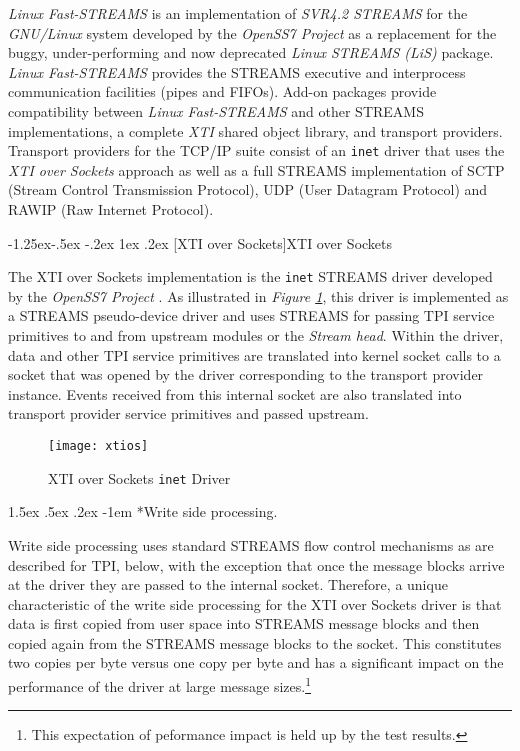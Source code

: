 \documentclass[letterpaper,final,notitlepage,twocolumn,10pt,twoside]{article}
\makeatletter
\renewcommand\subsubsection{\@startsection{subsubsection}{3}{\z@}%
                                     {-1.25ex\@plus -.5ex \@minus -.2ex}%
                                     {1ex \@plus .2ex}%
                                     {\normalfont\normalsize\bfseries}}
\renewcommand\paragraph{\@startsection{paragraph}{4}{\z@}%
                                    {1.5ex \@plus .5ex \@minus .2ex}%
                                    {-1em}%
                                    {\normalfont\normalsize\bfseries\slshape}}
\makeatother
\begin{document}
\textsl{Linux Fast-STREAMS} is an implementation of \textsl{SVR4.2 STREAMS}
for the \textsl{GNU/Linux} system developed by the \textsl{OpenSS7 Project}
\cite[]{openss7} as a replacement for the buggy, under-performing and now
deprecated \textsl{Linux STREAMS (LiS)} package.  \textsl{Linux Fast-STREAMS}
provides the STREAMS executive and interprocess communication facilities
(pipes and FIFOs).  Add-on packages provide compatibility between
\textsl{Linux Fast-STREAMS} and other STREAMS implementations, a complete
\textsl{XTI} shared object library, and transport providers.  Transport
providers for the TCP/IP suite consist of an \texttt{inet} driver that uses
the \textit{XTI over Sockets} approach as well as a full STREAMS
implementation of SCTP (Stream Control Transmission Protocol), UDP (User
Datagram Protocol) and RAWIP (Raw Internet Protocol).

\subsubsection[XTI over Sockets]{XTI over Sockets}

The XTI over Sockets implementation is the \texttt{inet} STREAMS driver
developed by the \textsl{OpenSS7 Project} \cite[]{openss7}. As illustrated in
\textit{Figure \ref{figure:xtios}}, this driver is implemented as a STREAMS
pseudo-device driver and uses STREAMS for passing TPI service primitives to
and from upstream modules or the \textit{Stream head}.  Within the driver,
data and other TPI service primitives are translated into kernel socket calls
to a socket that was opened by the driver corresponding to the transport
provider instance.  Events received from this internal socket are also
translated into transport provider service primitives and passed upstream.

\begin{figure}[htp]
\center\texttt{[image: xtios]}
\caption[XTI over Sockets \texttt{inet} Driver]{XTI over Sockets \texttt{inet} Driver}
\label{figure:xtios}
\end{figure}

\paragraph*{Write side processing.}

Write side processing uses standard STREAMS flow control mechanisms as are
described for TPI, below, with the exception that once the message blocks
arrive at the driver they are passed to the internal socket.  Therefore, a
unique characteristic of the write side processing for the XTI over Sockets
driver is that data is first copied from user space into STREAMS message
blocks and then copied again from the STREAMS message blocks to the socket.
This constitutes two copies per byte versus one copy per byte and has a
significant impact on the performance of the driver at large message
sizes.\footnote{This expectation of peformance impact is held up by the test
results.}
\end{document}
